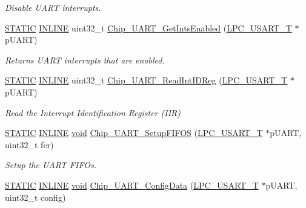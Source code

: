 \begin{DoxyCompactItemize}
\begin{DoxyCompactList}\small\item\em Disable U\-A\-R\-T interrupts. \end{DoxyCompactList}\item 
\hyperlink{group__LPC__Types__Public__Macros_ga10b2d890d871e1489bb02b7e70d9bdfb}{S\-T\-A\-T\-I\-C} \hyperlink{group__LPC__Types__Public__Types_ga2eb6f9e0395b47b8d5e3eeae4fe0c116}{I\-N\-L\-I\-N\-E} uint32\-\_\-t \hyperlink{group__UART__17XX__40XX_ga090e960cbbcc79be17bf52a52ec3595c}{Chip\-\_\-\-U\-A\-R\-T\-\_\-\-Get\-Ints\-Enabled} (\hyperlink{structLPC__USART__T}{L\-P\-C\-\_\-\-U\-S\-A\-R\-T\-\_\-\-T} $\ast$p\-U\-A\-R\-T)
\begin{DoxyCompactList}\small\item\em Returns U\-A\-R\-T interrupts that are enabled. \end{DoxyCompactList}\item 
\hyperlink{group__LPC__Types__Public__Macros_ga10b2d890d871e1489bb02b7e70d9bdfb}{S\-T\-A\-T\-I\-C} \hyperlink{group__LPC__Types__Public__Types_ga2eb6f9e0395b47b8d5e3eeae4fe0c116}{I\-N\-L\-I\-N\-E} uint32\-\_\-t \hyperlink{group__UART__17XX__40XX_ga6a69343d3d7025055dd2326a8fdd3c74}{Chip\-\_\-\-U\-A\-R\-T\-\_\-\-Read\-Int\-I\-D\-Reg} (\hyperlink{structLPC__USART__T}{L\-P\-C\-\_\-\-U\-S\-A\-R\-T\-\_\-\-T} $\ast$p\-U\-A\-R\-T)
\begin{DoxyCompactList}\small\item\em Read the Interrupt Identification Register (I\-I\-R) \end{DoxyCompactList}\item 
\hyperlink{group__LPC__Types__Public__Macros_ga10b2d890d871e1489bb02b7e70d9bdfb}{S\-T\-A\-T\-I\-C} \hyperlink{group__LPC__Types__Public__Types_ga2eb6f9e0395b47b8d5e3eeae4fe0c116}{I\-N\-L\-I\-N\-E} \hyperlink{Paradigm_2Tern__EE_2small_2portmacro_8h_a14d32f8130d3c0b212cfc751730b5b49}{void} \hyperlink{group__UART__17XX__40XX_gac1a9d00d4f324e319e1486138b097874}{Chip\-\_\-\-U\-A\-R\-T\-\_\-\-Setup\-F\-I\-F\-O\-S} (\hyperlink{structLPC__USART__T}{L\-P\-C\-\_\-\-U\-S\-A\-R\-T\-\_\-\-T} $\ast$p\-U\-A\-R\-T, uint32\-\_\-t fcr)
\begin{DoxyCompactList}\small\item\em Setup the U\-A\-R\-T F\-I\-F\-Os. \end{DoxyCompactList}\item 
\hyperlink{group__LPC__Types__Public__Macros_ga10b2d890d871e1489bb02b7e70d9bdfb}{S\-T\-A\-T\-I\-C} \hyperlink{group__LPC__Types__Public__Types_ga2eb6f9e0395b47b8d5e3eeae4fe0c116}{I\-N\-L\-I\-N\-E} \hyperlink{Paradigm_2Tern__EE_2small_2portmacro_8h_a14d32f8130d3c0b212cfc751730b5b49}{void} \hyperlink{group__UART__17XX__40XX_ga26626229fe35e820bf2daf6a87c43155}{Chip\-\_\-\-U\-A\-R\-T\-\_\-\-Config\-Data} (\hyperlink{structLPC__USART__T}{L\-P\-C\-\_\-\-U\-S\-A\-R\-T\-\_\-\-T} $\ast$p\-U\-A\-R\-T, uint32\-\_\-t config)

\end{DoxyCompactItemize}
